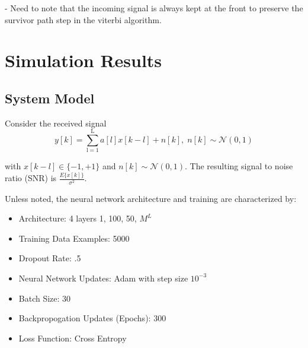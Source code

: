 \documentclass[12pt,a4paper]{report}
\begin{document}
%


- Need to note that the incoming signal is always kept at the front to preserve the survivor path step in the viterbi algorithm. 



\section{Simulation Results}
\subsection{System Model}
Consider the received signal 
\begin{equation}
y[k] = \sum_{\mathrm{l=1}}^{\mathrm{L}} a[l]x[k-l] + n[k], \; n[k]  \sim \mathcal{N}(0,1)
\end{equation}

with $x[k-l] \in \{ -1, +1\}$ and $n[k]  \sim \mathcal{N}(0,1)$.  
The resulting signal to noise ratio (SNR) is 
$\frac{E\{x[k]\}}{\sigma^2}$.

Unless noted, the neural network architecture and training are characterized by:
\begin{itemize}
\item Architecture: 4 layers {1, 100, 50, $M^L$}
\item Training Data Examples: 5000
\item Dropout Rate: .5
\item Neural Network Updates: Adam with step size $10^{-3}$ \cite{kingma2014adam}
\item Batch Size: 30 
\item Backpropogation Updates (Epochs): 300
\item Loss Function: Cross Entropy
\end{itemize}
\end{document}
